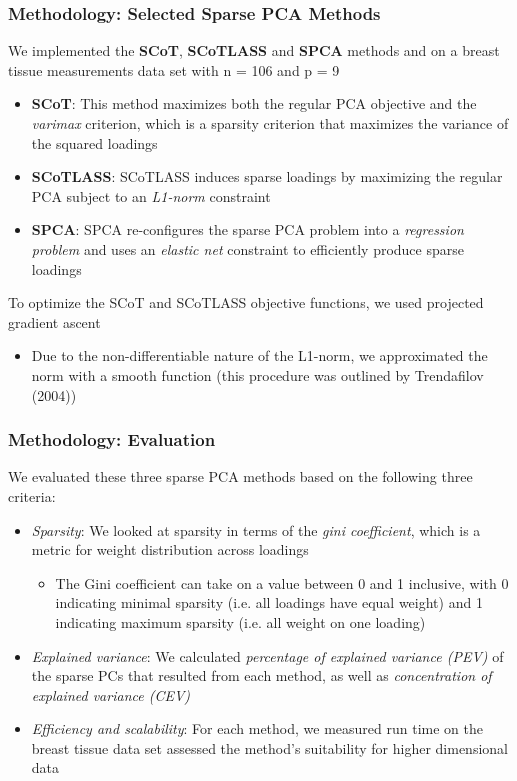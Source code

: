 \documentclass[11pt]{beamer}
\begin{document}
\begin{frame}\frametitle{Methodology: Selected Sparse PCA Methods}
We implemented the \textbf{SCoT}, \textbf{SCoTLASS} and \textbf{SPCA} methods and on a breast tissue measurements data set with n = 106 and p = 9\\
\begin{itemize}
    \item \textbf{SCoT}: This method maximizes both the regular PCA objective and the \textit{varimax} criterion, which is a sparsity criterion that maximizes the variance of the squared loadings
    \item \textbf{SCoTLASS}: SCoTLASS induces sparse loadings by maximizing the regular PCA subject to an \textit{L1-norm} constraint
    \item \textbf{SPCA}: SPCA re-configures the sparse PCA problem into a \textit{regression problem} and uses an \textit{elastic net} constraint to efficiently produce sparse loadings 
\end{itemize}
To optimize the SCoT and SCoTLASS objective functions, we used projected gradient ascent
\begin{itemize}
    \item Due to the non-differentiable nature of the L1-norm, we approximated the norm with a smooth function (this procedure was outlined by Trendafilov (2004))
\end{itemize}
\end{frame}

\begin{frame}\frametitle{Methodology: Evaluation}
We evaluated these three sparse PCA methods based on the following three criteria:
\begin{itemize}
    \item \textit{Sparsity}: We looked at sparsity in terms of the \textit{gini coefficient}, which is a metric for weight distribution across loadings
        \begin{itemize}
            \item The Gini coefficient can take on a value between 0 and 1 inclusive, with 0 indicating minimal sparsity (i.e. all loadings have equal weight) and 1 indicating maximum sparsity (i.e. all weight on one loading)
        \end{itemize}
    \item \textit{Explained variance}: We calculated \textit{percentage of explained variance (PEV)} of the sparse PCs that resulted from each method, as well as \textit{concentration of explained variance (CEV)}
    \item \textit{Efficiency and scalability}: For each method, we measured run time on the breast tissue data set assessed the method's suitability for higher dimensional data
\end{itemize}
\end{frame}
\end{document}

